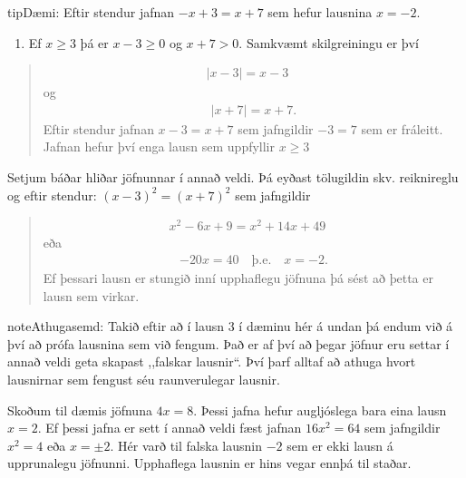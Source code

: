 \documentclass[a4paper,10pt,icelandic]{sphinxmanual}
\begin{document}
\begin{sphinxadmonition}{tip}{Dæmi:}
Eftir stendur jafnan \(-x+3=x+7\) sem hefur lausnina \(x=-2\).
\begin{enumerate}
%
\setcounter{enumi}{2}
\item {} 
Ef \(x\geq 3\) þá er \(x-3\geq 0\) og \(x+7>0\). Samkvæmt skilgreiningu er því

\end{enumerate}
\begin{quote}
\begin{equation*}
\begin{split}|x-3|=x-3 \quad\end{split}
\end{equation*}
og
\begin{equation*}
\begin{split}|x+7|=x+7.\end{split}
\end{equation*}
Eftir stendur jafnan \(x-3=x+7\) sem jafngildir \(-3=7\) sem er fráleitt.
Jafnan hefur því enga lausn sem uppfyllir \(x\geq 3\)
\end{quote}

 Setjum báðar hliðar jöfnunnar í annað veldi. Þá eyðast tölugildin skv. reiknireglu og eftir stendur: \((x-3)^2=(x+7)^2\) sem jafngildir
\begin{quote}
\begin{equation*}
\begin{split}x^2-6x+9=x^2+14x+49 \quad\end{split}
\end{equation*}
eða
\begin{equation*}
\begin{split}-20x=40 \quad \text{þ.e.} \quad x=-2.\end{split}
\end{equation*}
Ef þessari lausn er stungið inní upphaflegu jöfnuna þá sést að þetta er lausn sem virkar.
\end{quote}
\end{sphinxadmonition}

\begin{sphinxadmonition}{note}{Athugasemd:}
Takið eftir að í lausn 3 í dæminu hér á undan þá endum við á því að prófa lausnina sem við fengum.
Það er af því að þegar jöfnur eru settar í annað veldi geta skapast ,,falskar lausnir“.
Því þarf alltaf að athuga hvort lausnirnar sem fengust séu raunverulegar lausnir.

Skoðum til dæmis jöfnuna \(4x=8\). Þessi jafna hefur augljóslega bara eina lausn \(x=2\). Ef þessi jafna er sett í annað veldi fæst jafnan \(16x^2=64\) sem jafngildir \(x^2=4\) eða \(x=\pm 2\). Hér varð til falska lausnin \(-2\) sem er ekki lausn á upprunalegu jöfnunni. Upphaflega lausnin er hins vegar ennþá til staðar.
\end{sphinxadmonition}
\end{document}

